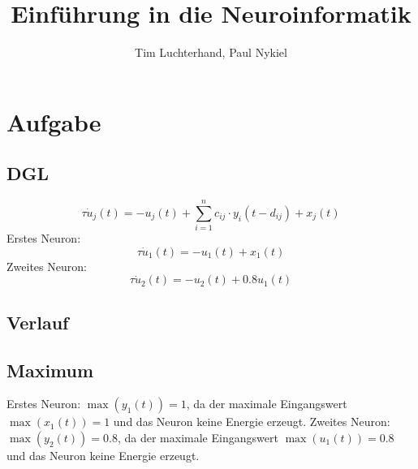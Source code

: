 \documentclass[DIN, pagenumber=false, fontsize=11pt, parskip=half]{scrartcl}
\title{Einführung in die Neuroinformatik}
\author{Tim Luchterhand, Paul Nykiel}
\begin{document}
    \maketitle
    \section{Aufgabe}
    \subsection{DGL}
    \begin{equation*}
        \tau \dot{u}_j(t) = -u_j(t) + \sum_{i=1}^n c_{ij} \cdot y_i(t-d_{ij}) + x_j(t)
    \end{equation*}
    Erstes Neuron:
    \begin{equation*}
        \tau \dot{u}_1(t) = -u_1(t) + x_1(t)
    \end{equation*}
    Zweites Neuron:
    \begin{equation*}
        \tau \dot{u}_2(t) = -u_2(t) + 0.8 u_1(t) 
    \end{equation*}
    \subsection{Verlauf}
    \subsection{Maximum} %
    Erstes Neuron: $\max(y_1(t)) = 1$, da der maximale Eingangswert $\max(x_1(t)) = 1$ und das Neuron keine Energie erzeugt. 
    Zweites Neuron: $\max(y_2(t)) = 0.8$, da der maximale Eingangswert $\max(u_1(t)) = 0.8$ und das Neuron keine Energie erzeugt. 
\end{document}
